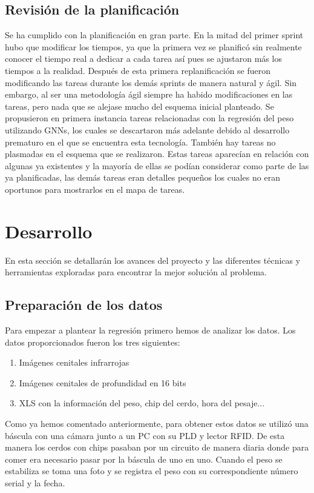﻿\documentclass[10pt,a4paper,twocolumn,twoside]{article}
\begin{document}
\subsection{Revisión de la planificación}

Se ha cumplido con la planificación en gran parte.
En la mitad del primer sprint hubo que modificar los tiempos, ya que la primera vez se planificó sin realmente conocer el tiempo real a dedicar a cada tarea así pues se ajustaron más los tiempos a la realidad. Después de esta primera replanificación se fueron modificando las tareas durante los demás sprints de manera natural y ágil.
Sin embargo, al ser una metodología ágil siempre ha habido modificaciones en las tareas, pero nada que se alejase mucho del esquema inicial planteado.
Se propusieron en primera instancia tareas relacionadas con la regresión del peso utilizando GNNs, los cuales se descartaron más adelante debido al desarrollo prematuro en el que se encuentra esta tecnología.
También hay tareas no plasmadas en el esquema que se realizaron. Estas tareas aparecían en relación con algunas ya existentes y la mayoría de ellas se podían considerar como parte de las ya planificadas, las demás tareas eran detalles pequeños los cuales no eran oportunos para mostrarlos en el mapa de tareas.

\section{Desarrollo}    
En esta sección se detallarán los avances del proyecto y las diferentes técnicas y herramientas exploradas para encontrar la mejor solución al problema.

\subsection{Preparación de los datos}
Para empezar a plantear la regresión primero hemos de analizar los datos.
Los datos proporcionados fueron los tres siguientes:
\begin{enumerate}

\item Imágenes cenitales infrarrojas
\item Imágenes cenitales de profundidad en 16 bits
\item XLS con la información del peso, chip del cerdo, hora del pesaje...
\end{enumerate}

Como ya hemos comentado anteriormente, para obtener estos datos se utilizó una báscula con una cámara junto a un PC con su PLD y lector RFID. De esta manera los cerdos con chips pasaban por un circuito de manera diaria donde para comer era necesario pasar por la báscula de uno en uno. Cuando el peso se estabiliza se toma una foto y se registra el peso con su correspondiente número serial y la fecha.
\end{document}
